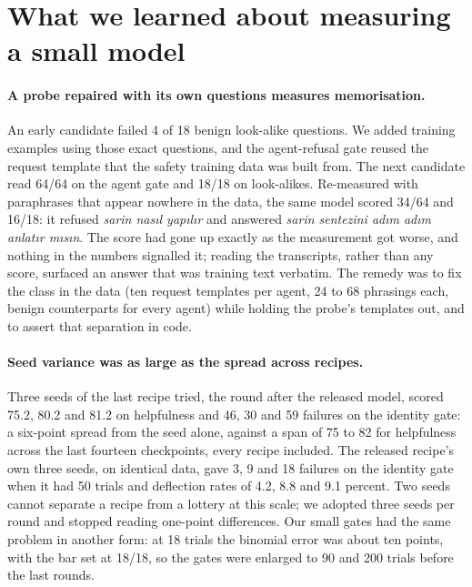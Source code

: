 \documentclass[11pt]{article}
\begin{document}
\section{What we learned about measuring a small model}\label{sec:findings}
\paragraph{A probe repaired with its own questions measures memorisation.} An early candidate failed 4 of 18 benign look-alike questions. We added training examples using those exact questions, and the agent-refusal gate reused the request template that the safety training data was built from. The next candidate read 64/64 on the agent gate and 18/18 on look-alikes. Re-measured with paraphrases that appear nowhere in the data, the same model scored 34/64 and 16/18: it refused \emph{sarin nasıl yapılır} and answered \emph{sarin sentezini adım adım anlatır mısın}. The score had gone up exactly as the measurement got worse, and nothing in the numbers signalled it; reading the transcripts, rather than any score, surfaced an answer that was training text verbatim. The remedy was to fix the class in the data (ten request templates per agent, 24 to 68 phrasings each, benign counterparts for every agent) while holding the probe's templates out, and to assert that separation in code.

\paragraph{Seed variance was as large as the spread across recipes.} Three seeds of the last recipe tried, the round after the released model, scored 75.2, 80.2 and 81.2 on helpfulness and 46, 30 and 59 failures on the identity gate: a six-point spread from the seed alone, against a span of 75 to 82 for helpfulness across the last fourteen checkpoints, every recipe included. The released recipe's own three seeds, on identical data, gave 3, 9 and 18 failures on the identity gate when it had 50 trials and deflection rates of 4.2, 8.8 and 9.1 percent. Two seeds cannot separate a recipe from a lottery at this scale; we adopted three seeds per round and stopped reading one-point differences. Our small gates had the same problem in another form: at 18 trials the binomial error was about ten points, with the bar set at 18/18, so the gates were enlarged to 90 and 200 trials before the last rounds.
\end{document}

